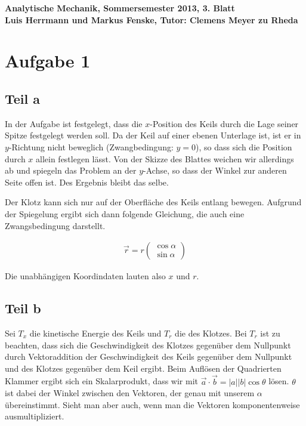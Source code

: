 \documentclass[a4paper,german,12pt,smallheadings]{scrartcl}
\begin{document}
\begin{center}
\bfseries %
\sffamily %
\vspace{-40pt}
Analytische Mechanik, Sommersemester 2013, 3. Blatt \\
Luis Herrmann und Markus Fenske, Tutor: Clemens Meyer zu Rheda
\vspace{-10pt}
\end{center}
\section*{Aufgabe 1}
\subsection*{Teil a}

In der Aufgabe ist festgelegt, dass die $x$-Position des Keils durch die Lage
seiner Spitze festgelegt werden soll. Da der Keil auf einer ebenen Unterlage
ist, ist er in $y$-Richtung nicht beweglich (Zwangbedingung: $y=0$), so dass
sich die Position durch $x$ allein festlegen lässt. Von der Skizze des Blattes
weichen wir allerdings ab und spiegeln das Problem an der $y$-Achse, so dass
der Winkel zur anderen Seite offen ist. Des Ergebnis bleibt das selbe.

Der Klotz kann sich nur auf der Oberfläche des Keils entlang bewegen. Aufgrund
der Spiegelung ergibt sich dann folgende Gleichung, die auch eine
Zwangsbedingung darstellt.

\begin{align*}
  \vec{r} =  r \begin{pmatrix} \cos \alpha \\ \sin \alpha \end{pmatrix}
\end{align*}

Die unabhängigen Koordindaten lauten also $x$ und $r$.

\subsection*{Teil b}

Sei $T_x$ die kinetische Energie des Keils und $T_r$ die des Klotzes. Bei $T_r$
ist zu beachten, dass sich die Geschwindigkeit des Klotzes gegenüber dem
Nullpunkt durch Vektoraddition der Geschwindigkeit des Keils gegenüber dem
Nullpunkt und des Klotzes gegenüber dem Keil ergibt. Beim Auflösen der
Quadrierten Klammer ergibt sich ein Skalarprodukt, dass wir mit $\vec{a} \cdot
\vec{b} = |a| |b| \cos \theta$ lösen. $\theta$ ist dabei der Winkel zwischen
den Vektoren, der genau mit unserem $\alpha$ übereinstimmt. Sieht man aber
auch, wenn man die Vektoren komponentenweise ausmultipliziert.
\end{document}
